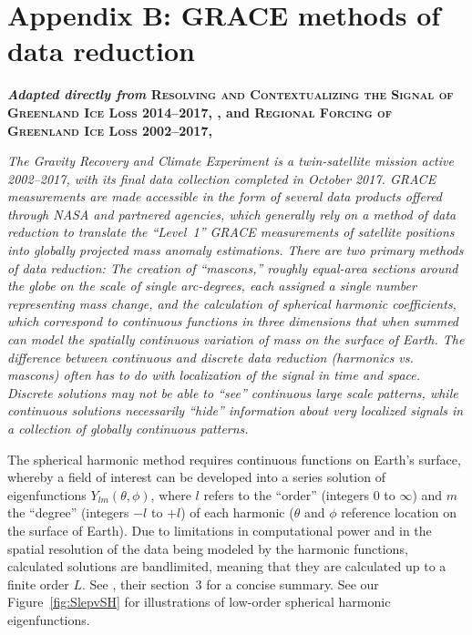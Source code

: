 \newpage
\appendix

\section{Appendix B: GRACE methods of data reduction \label{app:b}}
\textbf{\textit{Adapted directly from} \textsc{Resolving and Contextualizing the Signal of Greenland Ice Loss 2014--2017}, \cite{getraerFall}, and \textsc{Regional Forcing of Greenland Ice Loss 2002--2017}, \cite{getraerSpring}}

{\it
The Gravity Recovery and Climate Experiment is a twin-satellite mission active
2002--2017, with its final data collection completed in October 2017. GRACE
measurements are made accessible in the form of several data products offered
through NASA and partnered agencies, which generally rely on a method of data
reduction to translate the ``Level~1'' GRACE measurements of satellite positions into globally projected mass anomaly estimations. There are two primary
methods of data reduction: The creation of ``mascons,'' roughly equal-area
sections around the globe on the scale of single arc-degrees, each assigned a
single number representing mass change, and the calculation of spherical
harmonic coefficients, which correspond to continuous functions in three
dimensions that when summed can model the spatially continuous variation of mass
on the surface of Earth. The difference between continuous and discrete data reduction (harmonics vs. mascons) often has to do with localization of the signal in time and space. Discrete solutions may not be able to ``see'' continuous large scale patterns, while continuous solutions necessarily ``hide'' information about very localized signals in a collection of globally continuous patterns.

The spherical harmonic method requires continuous functions on Earth's surface, whereby a field of interest can be developed into a series solution of
eigenfunctions $Y_{lm}(\theta,\phi)$, where $l$ refers to the ``order''
(integers $0$ to $\infty$) and $m$ the ``degree'' (integers $-l$ to $+l$) of
each harmonic ($\theta$ and $\phi$ reference location on the surface of Earth). Due
to limitations in computational power and in the spatial resolution of the data
being modeled by the harmonic functions, calculated solutions are bandlimited,
meaning that they are calculated up to a finite order $L$. See
\cite{Simons+2006a}, their section~3 for a concise summary. See our
Figure~\ref{fig:SlepvSH} for illustrations of low-order spherical harmonic
eigenfunctions.

}
